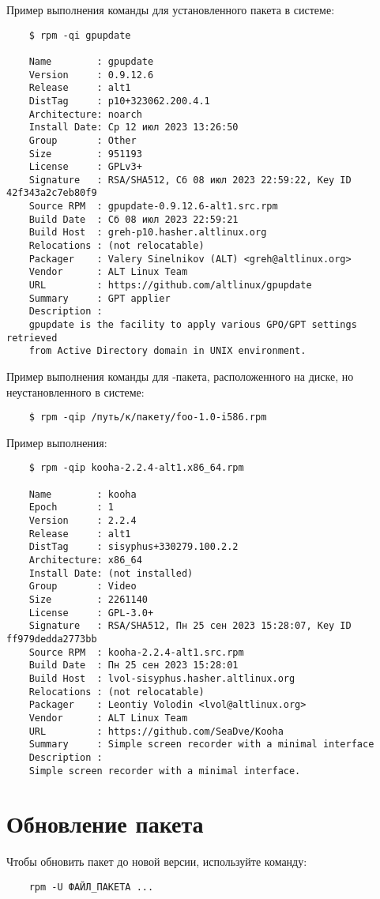 
Пример выполнения команды для установленного пакета в системе:
\begin{verbatim}
	$ rpm -qi gpupdate
	
	Name        : gpupdate
	Version     : 0.9.12.6
	Release     : alt1
	DistTag     : p10+323062.200.4.1
	Architecture: noarch
	Install Date: Ср 12 июл 2023 13:26:50
	Group       : Other
	Size        : 951193
	License     : GPLv3+
	Signature   : RSA/SHA512, Сб 08 июл 2023 22:59:22, Key ID 42f343a2c7eb80f9
	Source RPM  : gpupdate-0.9.12.6-alt1.src.rpm
	Build Date  : Сб 08 июл 2023 22:59:21
	Build Host  : greh-p10.hasher.altlinux.org
	Relocations : (not relocatable)
	Packager    : Valery Sinelnikov (ALT) <greh@altlinux.org>
	Vendor      : ALT Linux Team
	URL         : https://github.com/altlinux/gpupdate
	Summary     : GPT applier
	Description :
	gpupdate is the facility to apply various GPO/GPT settings retrieved
	from Active Directory domain in UNIX environment.
\end{verbatim}

Пример выполнения команды для -пакета, расположенного на диске, но неустановленного в системе:
\begin{verbatim}
	$ rpm -qip /путь/к/пакету/foo-1.0-i586.rpm
\end{verbatim}

Пример выполнения:
\begin{verbatim}
	$ rpm -qip kooha-2.2.4-alt1.x86_64.rpm
	
	Name        : kooha
	Epoch       : 1
	Version     : 2.2.4
	Release     : alt1
	DistTag     : sisyphus+330279.100.2.2
	Architecture: x86_64
	Install Date: (not installed)
	Group       : Video
	Size        : 2261140
	License     : GPL-3.0+
	Signature   : RSA/SHA512, Пн 25 сен 2023 15:28:07, Key ID ff979dedda2773bb
	Source RPM  : kooha-2.2.4-alt1.src.rpm
	Build Date  : Пн 25 сен 2023 15:28:01
	Build Host  : lvol-sisyphus.hasher.altlinux.org
	Relocations : (not relocatable)
	Packager    : Leontiy Volodin <lvol@altlinux.org>
	Vendor      : ALT Linux Team
	URL         : https://github.com/SeaDve/Kooha
	Summary     : Simple screen recorder with a minimal interface
	Description :
	Simple screen recorder with a minimal interface.
\end{verbatim}

\section{Обновление пакета}
Чтобы обновить пакет до новой версии, используйте команду:
\begin{verbatim}
	rpm -U ФАЙЛ_ПАКЕТА ...
\end{verbatim}

